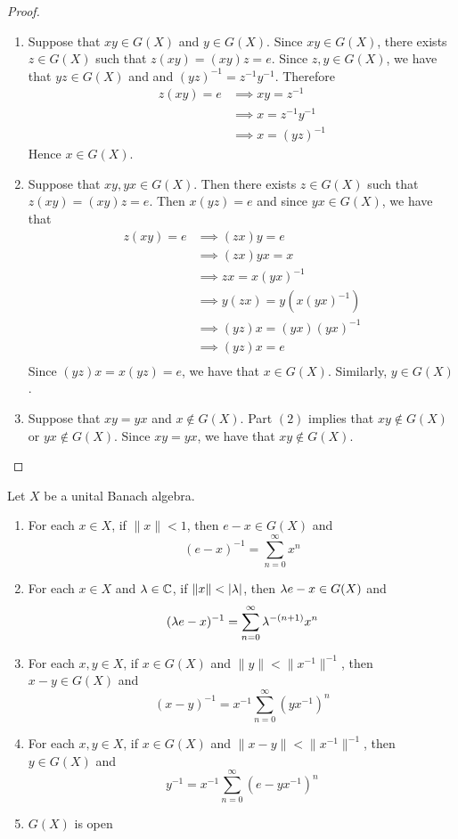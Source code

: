 \documentclass{book}
\begin{document}
\begin{proof}\
	\begin{enumerate}
	\item Suppose that $xy \in G(X)$ and $y \in G(X)$. Since $xy \in G(X)$, there exists $z \in G(X)$ such that $z(xy) = (xy)z = e$. Since $z, y \in G(X)$, we have that $yz \in G(X)$ and and $(yz)^{-1} = z^{-1}y^{-1}$. Therefore
	\begin{align*}
		z(xy) = e
		& \implies xy = z^{-1} \\
		& \implies x = z^{-1} y^{-1} \\
		& \implies x = (yz)^{-1}
	\end{align*} 
	Hence $x \in G(X)$.
	\item Suppose that $xy, yx \in G(X)$. Then there exists $z \in G(X)$ such that $z(xy) = (xy)z = e$. Then $x(yz) = e$ and since $yx \in G(X)$, we have that
	\begin{align*}
		z(xy) = e
		& \implies (zx)y = e \\
		& \implies (zx)yx = x \\
		& \implies zx = x(yx)^{-1} \\
		& \implies y(zx) = y(x(yx)^{-1}) \\
		& \implies (yz)x = (yx)(yx)^{-1} \\
		& \implies (yz)x = e \\
	\end{align*}
	Since $(yz)x = x(yz) = e$, we have that $x \in G(X)$. Similarly, $y \in G(X)$.
	\item Suppose that $xy = yx$ and $x \not \in G(X)$. Part $(2)$ implies that $xy \not \in G(X)$ or $yx \not \in G(X)$. Since $xy = yx$, we have that $xy \not \in G(X)$.
	\end{enumerate}
\end{proof}

\begin{ex} \lex{}
	Let $X$ be a unital Banach algebra. 
	\begin{enumerate}
		\item For each $x \in X$, if $\|x \|< 1$, then $e - x \in G(X)$ and $$(e-x)^{-1} = \sum_{n=0}^{\infty}x^n$$
		\item For each $x \in X$ and $\lambda \in \mathbb{C}$, if $\|x\| < |\lambda |$, then $\lambda e - x \in G(X)$ and 
		$$(\lambda e - x)^{-1} = \sum_{n=0}^{\infty} \lambda^{-(n+1)} x^n $$
		\item For each $x,y \in X$, if $x \in G(X)$  and $\|y \|< \|x^{-1} \|^{-1}$, then $x - y \in G(X)$ and $$(x-y)^{-1} = x^{-1}\sum_{n=0}^{\infty} (yx^{-1})^n$$
		\item For each $x,y \in X$, if $x \in G(X)$  and $\| x - y \|< \|x^{-1} \|^{-1}$, then $y \in G(X)$ and $$y^{-1} = x^{-1}\sum_{n=0}^{\infty} (e - yx^{-1})^n$$
		\item $G(X)$ is open
	\end{enumerate}
\end{ex}
\end{document}
